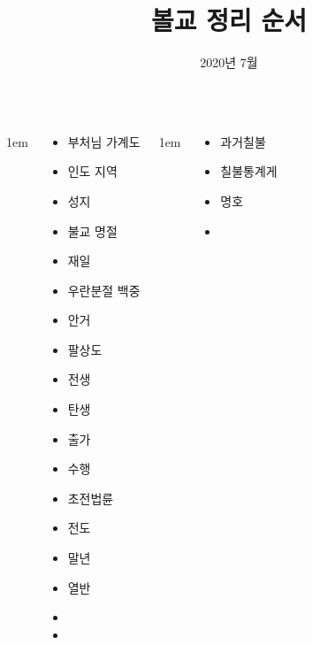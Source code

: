 \documentclass[20pt, a0paper, landscape]{tikzposter}
\title{ 볼교 정리 순서 }
\author{ 2020년 7월 }
\begin{document}
	\maketitle

	\begin{columns}


			{
					\setlength{\leftmargini}{4em}
					\setlength{\labelsep} {1em}
				\begin{LARGE}
					\begin{itemize}
					\item 부처님 가계도
					\item 인도 지역
					\item 성지
					\item 불교 명절
					\item 재일 
					\item 우란분절 백중
					\item 안거 

					\item 팔상도
					\item 전생
					\item 탄생
					\item 출가
					\item 수행
					\item 초전법륜
					\item 전도
					\item 말년
					\item 열반
					\item
					\item
					\end{itemize}
				\end{LARGE}
			} %


			{
					\setlength{\leftmargini}{4em}
					\setlength{\labelsep} {1em}
				\begin{LARGE}
					\begin{itemize}
					\item 과거칠불
					\item 칠불통계게
					\item 명호
					\item 
					\end{itemize}
				\end{LARGE}
			} %



\end{columns}
\end{document}
